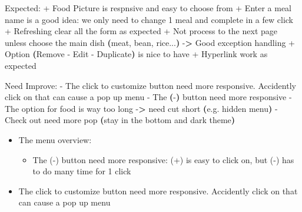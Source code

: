 \documentclass[
]{article}
\newenvironment{Shaded}{\begin{snugshade}}{\end{snugshade}}
\newcommand{\AttributeTok}[1]{\textcolor[rgb]{0.77,0.63,0.00}{#1}}
\newcommand{\ErrorTok}[1]{\textcolor[rgb]{0.64,0.00,0.00}{\textbf{#1}}}
\newcommand{\ExtensionTok}[1]{#1}
\newcommand{\KeywordTok}[1]{\textcolor[rgb]{0.13,0.29,0.53}{\textbf{#1}}}
\newcommand{\NormalTok}[1]{#1}
\newcommand{\OperatorTok}[1]{\textcolor[rgb]{0.81,0.36,0.00}{\textbf{#1}}}
\providecommand{\tightlist}{%
  \setlength{\itemsep}{0pt}\setlength{\parskip}{0pt}}
\begin{document}
\begin{Shaded}
\begin{Highlighting}[]
\ExtensionTok{Expected:}
\ExtensionTok{+}\NormalTok{ Food Picture is respnsive and easy to choose from}
\ExtensionTok{+}\NormalTok{ Enter a meal name is a good idea: we only need to change 1 meal and complete in a few click}
\ExtensionTok{+}\NormalTok{ Refreshing clear all the form as expected}
\ExtensionTok{+}\NormalTok{ Not process to the next page unless choose the main dish }\ErrorTok{(}\ExtensionTok{meat,}\NormalTok{ bean, rice...}\KeywordTok{)} \ExtensionTok{{-}}\OperatorTok{\textgreater{}}\NormalTok{ Good exception handling}
\ExtensionTok{+}\NormalTok{ Option }\ErrorTok{(}\ExtensionTok{Remove} \AttributeTok{{-}}\NormalTok{ Edit }\AttributeTok{{-}}\NormalTok{ Duplicate}\KeywordTok{)} \ExtensionTok{is}\NormalTok{ nice to have}
\ExtensionTok{+}\NormalTok{ Hyperlink work as expected}

\ExtensionTok{Need}\NormalTok{ Improve:}
\ExtensionTok{{-}}\NormalTok{ The click to customize button need more responsive. Accidently click on that can cause a pop up menu}
\ExtensionTok{{-}}\NormalTok{ The }\ErrorTok{(}\ExtensionTok{{-}}\KeywordTok{)} \ExtensionTok{button}\NormalTok{ need more responsive}
\ExtensionTok{{-}}\NormalTok{ The option for food is way too long }\AttributeTok{{-}}\OperatorTok{\textgreater{}}\NormalTok{ need cut short }\ErrorTok{(}\ExtensionTok{e.g.}\NormalTok{ hidden menu}\KeywordTok{)}
\ExtensionTok{{-}}\NormalTok{ Check out need more pop }\ErrorTok{(}\ExtensionTok{stay}\NormalTok{ in the bottom and dark theme}\KeywordTok{)}
\end{Highlighting}
\end{Shaded}

\begin{itemize}
\tightlist
\item
  The menu overview:

  \begin{itemize}
  \tightlist
  \item
    The (-) button need more responsive: (+) is easy to click on, but
    (-) has to do many time for 1 click
  \end{itemize}
\end{itemize}

\begin{itemize}
\tightlist
\item
  The click to customize button need more responsive. Accidently click
  on that can cause a pop up menu
\end{itemize}
\end{document}
